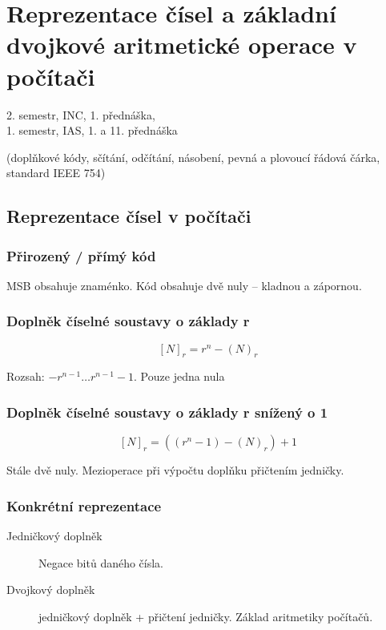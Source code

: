 \documentclass[a4paper, 11pt]{report}
\begin{document}
\setcounter{chapter}{8}
\chapter{Reprezentace čísel a základní dvojkové aritmetické operace v počítači} \label{cha:9}

2. semestr, INC, 1. přednáška,\\
1. semestr, IAS, 1. a 11. přednáška

(doplňkové kódy, sčítání, odčítání, násobení, pevná a plovoucí řádová čárka, standard IEEE 754)

\section{Reprezentace čísel v počítači}

\subsection{Přirozený / přímý kód}

MSB obsahuje znaménko. Kód obsahuje dvě nuly -- kladnou a zápornou.

\subsection{Doplněk číselné soustavy o základy r}

$$ [N]_r = r^n - (N)_r $$

Rozsah: $ -r^{n-1} \dots r^{n-1} - 1 $. Pouze jedna nula

\subsection{Doplněk číselné soustavy o základy r snížený o 1}

$$ [N]_r = ((r^n -1) - (N)_r)+1$$

Stále dvě nuly. Mezioperace při výpočtu doplňku přičtením jedničky.

\subsection{Konkrétní reprezentace}
\begin{description}
	\item[Jedničkový doplněk] Negace bitů daného čísla.
	\item[Dvojkový doplněk] jedničkový doplněk + přičtení jedničky. Základ aritmetiky počítačů.
\end{description}
\end{document}
